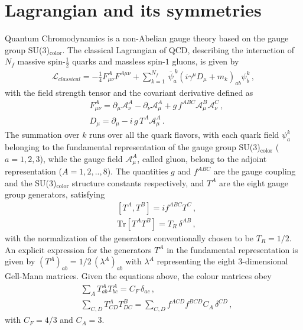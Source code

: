 \section{Lagrangian and its symmetries}
%
Quantum Chromodynamics is a non-Abelian gauge theory based on the gauge group SU(3)$_\text{color}$.
The classical Lagrangian of QCD, describing the interaction of $N_f$ massive spin-$\frac{1}{2}$ quarks
and massless spin-$1$ gluons, is given by
\begin{align}
    \label{eq:QCD_lagrangian}
    \mathcal{L}_{classical} = -\frac{1}{4}F^{A}_{\mu\nu}F^{A\mu\nu} + 
    \sum_{k=1}^{N_f}\,{\overline{\psi}}^{\,k}_a\left(i\gamma^{\mu}D_{\mu} + m_k\right)_{ab}\psi^k_b\,,
\end{align}
with the field strength tensor and the covariant derivative defined as
\begin{align}
    \label{eq:field_strength_thensor}
    &F^{A}_{\mu\nu} = \partial_{\mu} \mathcal{A}^A_{\nu} - \partial_{\nu} \mathcal{A}^A_{\mu} 
    + g \, f^{ABC} \mathcal{A}^B_{\mu}\mathcal{A}^C_{\nu}\,, \\
    \label{eq:covariant_derivateive}
    &D_{\mu} = \partial_{\mu} - i\,g\,T^A \mathcal{A}^{A}_{\mu}\,.
\end{align}
The summation over $k$ runs over all the quark flavors, with
each quark field $\psi^k_a$ belonging to the fundamental representation of the gauge group SU(3)$_\text{color}$ ($a=1,2,3$),
while the gauge field $\mathcal{A}^A_{\mu}$, called gluon, belong to the adjoint representation
($A=1,2,..,8$). The quantities $g$ and $f^{ABC}$ are the gauge coupling and the SU(3)$_\text{color}$ structure constants
respectively, and $T^A$ are the eight gauge group generators, satisfying
\begin{align}
    \label{eq:algebra}
    &\left[T^A,T^B\right] = i f^{ABC} T^C\,, \\
    \label{eq:normalization_SU3_generators}
    &\text{Tr}\left[T^A T^B\right] = T_R\, \delta^{AB}\,,
\end{align}
with the normalization of the generators conventionally chosen to be $T_R = 1/2$. 
An explicit expression for the generators $T^A$ in the fundamental representation is given by
$(T^A)_{ab} = 1/2\,\left(\lambda^A\right)_{ab}$ with $\lambda^A$ representing the eight 3-dimensional Gell-Mann matrices. 
Given the equations above, the colour matrices obey
\begin{align}
    \label{eq:SU3_generators_relations}
    &\sum_A T^A_{ab} T^A_{bc} = C_F\, \delta_{ac}\,,\\
    &\sum_{C,D} T^A_{CD} T^B_{DC} = \sum_{C,D} f^{ACD} f^{BCD}  C_A\, \delta^{CD}\,,
\end{align}
with $C_F= 4/3$ and $C_A= 3$.


